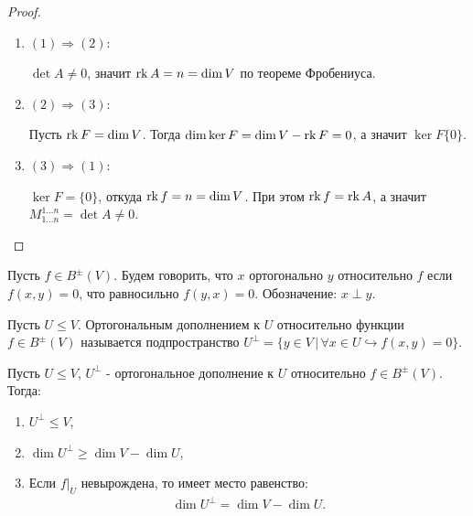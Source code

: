 \begin{proof}~
    \begin{enumerate}
        \item $(1) \Rightarrow (2)$:
        
        $\det A \neq 0$, значит $\operatorname{rk} A = n = \dim V$ по теореме Фробениуса.
        \item $(2) \Rightarrow (3)$:
        
        Пусть $\operatorname{rk} F = \dim V$. Тогда $\dim \ker F = \dim V - \operatorname{rk} F = 0$, а значит $\ker F \{0\}$.
        \item $(3) \Rightarrow (1)$:
        
        $\ker F = \{0\}$, откуда $\operatorname{rk} f = n = \dim V$. При этом $\operatorname{rk} f = \operatorname{rk} A$, а значит 
        $M_{1\dots n}^{1\dots n} = \det A \neq 0$.
    \end{enumerate}
\end{proof}

\begin{definition}
    Пусть $f \in B^{\pm}(V)$. Будем говорить, что $x$ ортогонально $y$ относительно $f$ если 
    $f(x, y) = 0$, что равносильно $f(y, x) = 0$. Обозначение: $x \perp y$.
\end{definition}

\begin{definition}
    Пусть $U \leq V$. Ортогональным дополнением к $U$ относительно функции $f \in B^{\pm}(V)$ 
    называется подпространство $U^{\perp} = \{y \in V \,\vert \, \forall x \in U \hookrightarrow 
    f(x, y) = 0\}$.
\end{definition}

\begin{proposition}
    \label{pr8.8}
    Пусть $U \leq V$, $U^{\perp}$ - ортогональное дополнение к $U$ относительно $f \in B^{\pm}(V)$. 
    Тогда:
    \begin{enumerate}
        \item $U^{\perp} \leq V$,
        \item $\dim U^{\perp} \geq \dim V - \dim U$,
        \item Если $f \vert_{U}$ невырождена, то имеет место равенство: 
        \begin{gather*}
            \dim U^{\perp} = \dim V - \dim U.
        \end{gather*}
    \end{enumerate}
\end{proposition}

